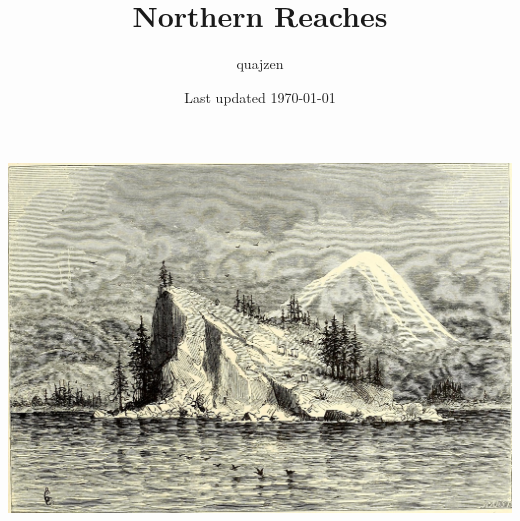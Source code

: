 \documentclass[notitlepage]{article}
\title{Northern Reaches}
\author{quajzen}
\date{Last updated \today}
\begin{document}
\maketitle
\vfill
\includegraphics[width=\textwidth]{cover}
\newpage
\tableofcontents
\listoftables
\newpage
\end{document}
